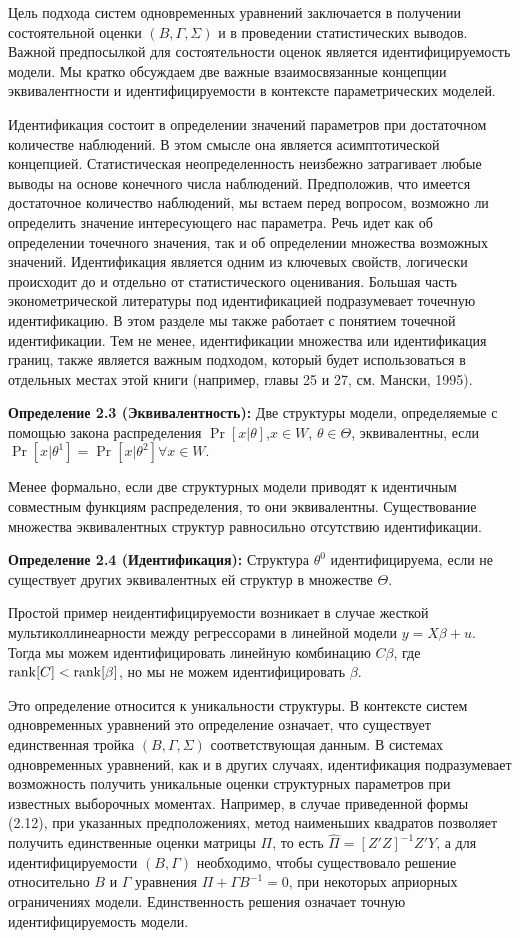 Цель подхода систем одновременных уравнений заключается в получении состоятельной оценки $(B,\Gamma,\Sigma)$ и в проведении статистических выводов. Важной предпосылкой для состоятельности оценок является идентифицируемость модели. Мы кратко обсуждаем две важные  взаимосвязанные концепции  эквивалентности и идентифицируемости в контексте параметрических моделей.


Идентификация состоит в определении значений параметров при достаточном количестве наблюдений. В этом смысле она является асимптотической концепцией. Статистическая неопределенность неизбежно затрагивает любые выводы на основе конечного числа наблюдений. 
Предположив, что имеется достаточное количество наблюдений, мы встаем перед вопросом, возможно ли определить значение интересующего нас параметра. Речь идет как об определении точечного значения, так и об определении множества возможных  значений. 
Идентификация является одним из ключевых свойств, логически происходит до и отдельно от  статистического оценивания. Большая часть эконометрической литературы под идентификацией подразумевает точечную идентификацию. В этом разделе мы также работает с понятием точечной идентификации. Тем не менее, идентификации множества или идентификация границ, также является важным подходом, который будет использоваться в отдельных местах этой книги (например, главы 25 и 27, см. Мански, 1995).


{\bf Определение 2.3 (Эквивалентность):} Две структуры модели, определяемые с помощью закона распределения  $\Pr[x|\theta]$,$x\in W$, $\theta \in \Theta$,  эквивалентны, если $\Pr[x|\theta^{1}]=\Pr[x|\theta^{2}] \forall x \in W.$ 


Менее формально,  если две структурных  модели приводят к идентичным  совместным функциям   распределения, то они эквивалентны. Существование множества  эквивалентных структур равносильно отсутствию идентификации.

{\bf Определение 2.4 (Идентификация):} Структура $\theta^{0}$ идентифицируема, если не существует других эквивалентных ей структур в множестве $\Theta$.


Простой пример неидентифицируемости  возникает в случае жесткой мультиколлинеарности между регрессорами в линейной модели $y=X\beta+u$. Тогда мы можем идентифицировать линейную комбинацию $C\beta$, где $\mathrm{rank}[C] < \mathrm{rank}[\beta]$, но мы не можем идентифицировать $\beta$.


Это определение относится к уникальности структуры. В контексте систем одновременных уравнений  это определение означает, что существует единственная тройка $(B,\Gamma,\Sigma)$ соответствующая данным. 
В системах одновременных уравнений, как и в других случаях, идентификация подразумевает возможность получить уникальные оценки структурных параметров при известных выборочных моментах. Например, в случае приведенной формы (2.12), при указанных предположениях, метод наименьших квадратов позволяет получить единственные оценки матрицы $\Pi$, то есть $\hat{\Pi}=[Z'Z]^{-1}Z'Y$, а для идентифицируемости  $(B,\Gamma)$ необходимо, чтобы существовало решение относительно $B$ и $\Gamma$  уравнения $\Pi+\Gamma B^{-1}=0$, при некоторых  априорных ограничениях  модели. 
Единственность решения означает точную  идентифицируемость модели.

